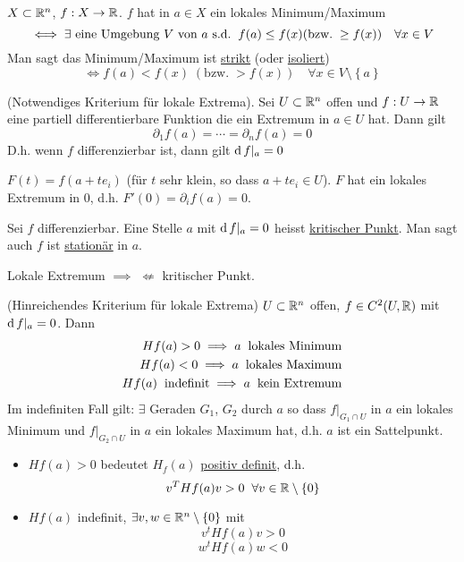 \begin{Def}
  $X\subset \mathbb{R}^n$, $f:X\rightarrow \mathbb{R}$. $f$ hat in $a\in X$ ein lokales Minimum/Maximum 
  \[\iff\exists \mbox{ eine Umgebung $V$ von $a$ s.d.}\hspace{2mm} f(a)\leq f(x) (\text{bzw.}\; \geq f(x))\quad\forall x\in V\]
  Man sagt das Minimum/Maximum ist \ul{strikt} (oder \ul{isoliert})
  \[\iff f(a)<f(x)\;(\text{bzw.}\;>f(x))\quad\forall x\in V\setminus \left\{ a \right\}\]
\end{Def}
\begin{Sat}
  (Notwendiges Kriterium für lokale Extrema). Sei $U\subset\mathbb{R}^n$ offen und $f:U\rightarrow\mathbb{R}$
eine partiell differentierbare Funktion die ein Extremum in $a\in U$ hat.  Dann gilt
  \[\partial_1f(a)=\cdots=\partial_nf(a)=0\]
  D.h. wenn $f$ differenzierbar ist, dann gilt $\operatorname{d} f|_a=0$
\end{Sat}
\begin{Bew}
  $F(t)=f(a+t e_i)$ (für $t$ sehr klein, so dass $a+t e_i\in U$). $F$ hat ein lokales Extremum in 0, d.h. 
$F'(0)=\partial_i f(a)=0$.
\end{Bew}
\begin{Def}
Sei  $f$ differenzierbar. Eine Stelle $a$ mit $\operatorname{d} f|_a=0$ heisst \ul{kritischer Punkt}. 
Man sagt auch $f$ ist \ul{stationär} in $a$. 
\end{Def}
\begin{Bem}
  Lokale Extremum $\implies$ $\not\Leftarrow$ kritischer Punkt.
\end{Bem}
\begin{Sat}
  (Hinreichendes Kriterium für lokale Extrema) $U\subset\mathbb{R}^n$ offen, $f\in C^2(U,\mathbb{R})$ mit $\operatorname{d} f|_a=0$. Dann
  \begin{eqnarray*}
    H f(a)>0\implies a\hspace{2mm}\text{lokales Minimum}\\
    H f(a)<0\implies a\hspace{2mm}\text{lokales Maximum}\\
    H f(a)\hspace{2mm}\text{indefinit}\implies a\hspace{2mm}\text{kein Extremum}
  \end{eqnarray*}
  Im indefiniten Fall gilt: $\exists$ Geraden $G_1$, $G_2$ durch $a$ so dass $f|_{G_1\cap U}$ in $a$ ein lokales Minimum und $f|_{G_2\cap U}$ in $a$ ein lokales Maximum hat, d.h. $a$ ist ein Sattelpunkt.
\end{Sat}
\begin{Bem}
  \begin{itemize}
    \item
      $H f(a)>0$ bedeutet $H_f(a)$ \ul{positiv definit}, d.h. 
      \[v^TH f(a)v>0\hspace{2mm}\forall v\in\mathbb{R}\setminus\left\{ 0 \right\}\]
    \item
      $H f(a)$ indefinit, $\exists v,w\in\mathbb{R}^n\setminus\left\{ 0 \right\}$ mit
      \[v^tH f(a)v>0\]
      \[w^tH f(a)w<0\]
  \end{itemize}
\end{Bem}
